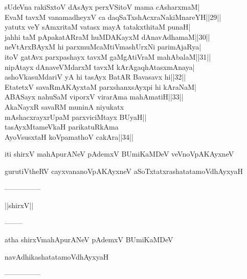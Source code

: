 \documentclass{article}
\begin{document}
sUdeVna rakiSxtoV dAsAyx perxVSitoV mama cAsharxmaM|\\
EvaM tavxM vanamadheyxV ca daqSaTxshAcxraNakiMnareYH||29||\\
yatutx veY sAmxritaM vatasx mayA tatakxthitaM punaH|\\
jahhi taM pApakatARraM huMDAKayxM dAnavAdhamaM||30||\\
neVtArxBAyxM hi parxmuMcaMtiVmashUrxNi parimAjaRya|\\
itoV gatAvx parxpashayx tavxM gaMgAtiVraM mahAbalaM||31||\\
nipAtayx dAnaveVMdarxM tavxM kArAgaqhAtasxmAnaya|\\
ashoVkasuMdariV yA hi tasAyx BatAR Bavasavx hi||32||\\
EtatetxV savaRmAKAyxtaM parxshanxsAyxpi hi kAraNaM|\\
ABASayx nahuSaM viporxV virarAma mahAmatiH||33||\\
AkaNayxR savaRM muninA niyukatx\\
mAshacxrayxrUpaM parxviciMtayx BUyaH||\\
tasAyxMtameVkaH parikatuRkAma\\
AyoVsusxtaH koVpamathoV cakAra||34||

\begin{center}
iti shirxV mahApurANeV pAdemxV BUmiKaMDeV veVnoVpAKAyxneV
\end{center}

\begin{center}
gurutiVtheRV cayxvananoVpAKAyxneV aSoTxtatxrashatatamoVdhAyxyaH
\end{center}

\begin{center}
---------------
\end{center}

\begin{center}
||shirxV||
\end{center}

\begin{center}
--------
\end{center}

\begin{center}
atha shirxVmahApurANeV pAdemxV BUmiKaMDeV
\end{center}

\begin{center}
navAdhikashatatamoVdhAyxyaH
\end{center}

\begin{center}
---------------
\end{center}
\end{document}
